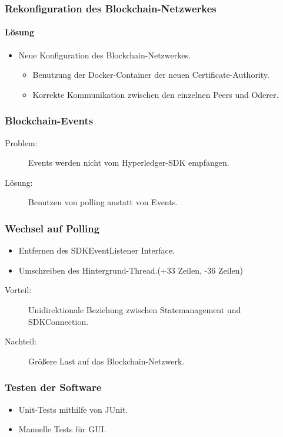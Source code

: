 \documentclass{beamer}
\begin{document}
\begin{frame}
\frametitle{Rekonfiguration des Blockchain-Netzwerkes}
\framesubtitle{Lösung}
	\begin{itemize}
		\item Neue Konfiguration des Blockchain-Netzwerkes.
		\begin{itemize}
			\item Benutzung der Docker-Container der neuen Certificate-Authority.
			\item Korrekte Kommunikation zwischen den einzelnen Peers und Oderer.
		\end{itemize}
	\end{itemize}
\end{frame}

\begin{frame}
\frametitle{Blockchain-Events}
	\begin{description}
		\item[Problem:] Events werden nicht vom Hyperledger-SDK empfangen.
		\item[Lösung:] Benutzen von polling anstatt von Events.
	\end{description}
\end{frame}

\begin{frame}
\frametitle{Wechsel auf Polling}
	\begin{itemize}
		\item Entfernen des SDKEventListener Interface.
		\item Umschreiben des Hintergrund-Thread.(\textcolor{green}{+}33 Zeilen, \textcolor{red}{-}36 Zeilen)
	\end{itemize}		
	\pause
	\begin{description}
		\item[Vorteil:] Unidirektionale Beziehung zwischen Statemanagement und SDKConnection.
		\item[Nachteil:] Größere Last auf das Blockchain-Netzwerk.
	\end{description}
\end{frame}

\begin{frame}
\frametitle{Testen der Software}
	\begin{itemize}
		\item Unit-Tests mithilfe von JUnit.
		\item Manuelle Tests für GUI.
	\end{itemize}
\end{frame}
\end{document}

